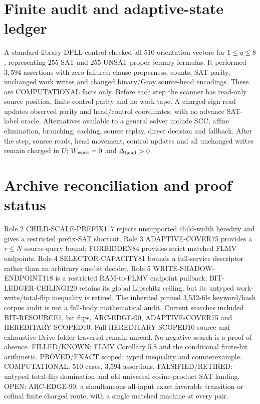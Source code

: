 \documentclass[11pt]{article}
\begin{document}
\section{Finite audit and adaptive-state ledger}
A standard-library DPLL control checked all $510$ orientation vectors for $1\le q\le8$, representing $255$ SAT and $255$ UNSAT proper ternary formulas. It performed $3,594$ assertions with zero failures: clause properness, counts, SAT parity, unchanged work writes and changed binary/Gray source-head encodings. These are COMPUTATIONAL facts only.
Before each step the scanner has read-only source position, finite-control parity and no work tape. A charged sign read updates observed parity and head/control coordinates, with no advance SAT-label oracle. Alternatives available to a general solver include SCC, affine elimination, branching, caching, source replay, direct decision and fallback. After the step, source reads, head movement, control updates and all unchanged writes remain charged in $U$; $W_{\rm work}=0$ and $\Delta_{\rm head}>0$.
\section{Archive reconciliation and proof status}
Role 2 CHILD-SCALE-PREFIX117 rejects unsupported child-width heredity and gives a restricted prefix-SAT shortcut. Role 3 ADAPTIVE-COVER75 provides a $\tau\le N$ source-query bound; FORBIDDEN84 provides strict matched FLMV endpoints. Role 4 SELECTOR-CAPACITY81 bounds a full-service descriptor rather than an arbitrary one-bit decider. Role 5 WRITE-SHADOW-ENDPOINT118 is a restricted RAM-to-FLMV endpoint pullback; BIT-LEDGER-CEILING120 retains its global Lipschitz ceiling, but its untyped work-write/total-flip inequality is retired.
The inherited pinned 3,532-file keyword/hash corpus audit is not a full-body mathematical audit. Current searches included BIT-RESOURCE1, bit flips, ARC-EDGE-90, ADAPTIVE-COVER75 and HEREDITARY-SCOPED10. Full HEREDITARY-SCOPED10 source and exhaustive Drive folder traversal remain unread. No negative search is a proof of absence.
FILLED/KNOWN: FLMV Corollary 5.8 and the conditional finite-hit arithmetic. PROVED/EXACT scoped: typed inequality and counterexample. COMPUTATIONAL: 510 cases, 3,594 assertions. FALSIFIED/RETIRED: untyped total-flip domination and old universal cosine-product SAT landing. OPEN: ARC-EDGE-90, a simultaneous all-input exact favorable transition or cofinal finite charged route, with a single matched machine at every pair.
\end{document}
